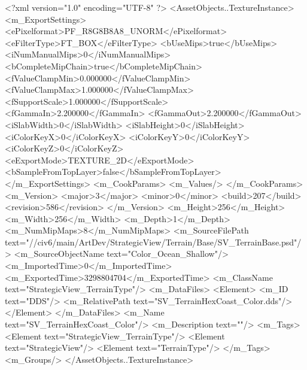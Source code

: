 <?xml version="1.0" encoding="UTF-8" ?>
<AssetObjects..TextureInstance>
	<m_ExportSettings>
		<ePixelformat>PF_R8G8B8A8_UNORM</ePixelformat>
		<eFilterType>FT_BOX</eFilterType>
		<bUseMips>true</bUseMips>
		<iNumManualMips>0</iNumManualMips>
		<bCompleteMipChain>true</bCompleteMipChain>
		<fValueClampMin>0.000000</fValueClampMin>
		<fValueClampMax>1.000000</fValueClampMax>
		<fSupportScale>1.000000</fSupportScale>
		<fGammaIn>2.200000</fGammaIn>
		<fGammaOut>2.200000</fGammaOut>
		<iSlabWidth>0</iSlabWidth>
		<iSlabHeight>0</iSlabHeight>
		<iColorKeyX>0</iColorKeyX>
		<iColorKeyY>0</iColorKeyY>
		<iColorKeyZ>0</iColorKeyZ>
		<eExportMode>TEXTURE_2D</eExportMode>
		<bSampleFromTopLayer>false</bSampleFromTopLayer>
	</m_ExportSettings>
	<m_CookParams>
		<m_Values/>
	</m_CookParams>
	<m_Version>
		<major>3</major>
		<minor>0</minor>
		<build>207</build>
		<revision>586</revision>
	</m_Version>
	<m_Height>256</m_Height>
	<m_Width>256</m_Width>
	<m_Depth>1</m_Depth>
	<m_NumMipMaps>8</m_NumMipMaps>
	<m_SourceFilePath text="//civ6/main/ArtDev/StrategicView/Terrain/Base/SV_TerrainBase.psd"/>
	<m_SourceObjectName text="Color_Ocean_Shallow"/>
	<m_ImportedTime>0</m_ImportedTime>
	<m_ExportedTime>3298804704</m_ExportedTime>
	<m_ClassName text="StrategicView_TerrainType"/>
	<m_DataFiles>
		<Element>
			<m_ID text="DDS"/>
			<m_RelativePath text="SV_TerrainHexCoast_Color.dds"/>
		</Element>
	</m_DataFiles>
	<m_Name text="SV_TerrainHexCoast_Color"/>
	<m_Description text=""/>
	<m_Tags>
		<Element text="StrategicView_TerrainType"/>
		<Element text="StrategicView"/>
		<Element text="TerrainType"/>
	</m_Tags>
	<m_Groups/>
</AssetObjects..TextureInstance>

